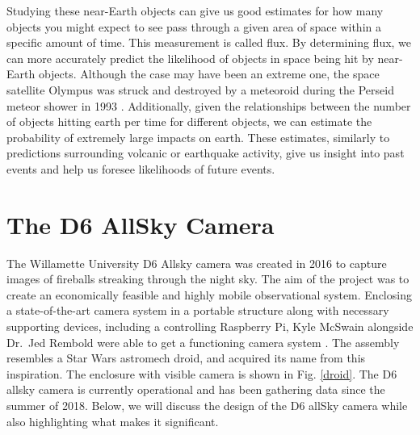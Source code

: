 Studying these near-Earth objects can give us good estimates for how many objects you might expect to see pass through a given area of space within a specific amount of time.
This measurement is called flux.
By determining flux, we can more accurately predict the likelihood of objects in space being hit by near-Earth objects. 
Although the case may have been an extreme one, the space satellite Olympus was struck and destroyed by a meteoroid during the Perseid meteor shower in 1993 \cite{bobrowsky_comet/asteroid_nodate}.
Additionally, given the relationships between the number of objects hitting earth per time for different objects, we can estimate the probability of extremely large impacts on earth.
These estimates, similarly to predictions surrounding volcanic or earthquake activity, give us insight into past events and help us foresee likelihoods of future events.








\section{The D6 AllSky Camera}

The Willamette University D6 Allsky camera was created in 2016 to capture images of fireballs streaking through the night sky. 
The aim of the project was to create an economically feasible and highly mobile observational system.
Enclosing a state-of-the-art camera system in a portable structure along with necessary supporting devices, including a controlling Raspberry Pi, Kyle McSwain alongside Dr.\ Jed Rembold were able to get a functioning camera system \cite{mcswain_using_2016}. 
The assembly resembles a Star Wars astromech droid, and acquired its name from this inspiration.
The enclosure with visible camera is shown in Fig. \ref{droid}.
The D6 allsky camera is currently operational and has been gathering data since the summer of 2018.  
Below, we will discuss the design of the D6 allSky camera while also highlighting what makes it significant.

